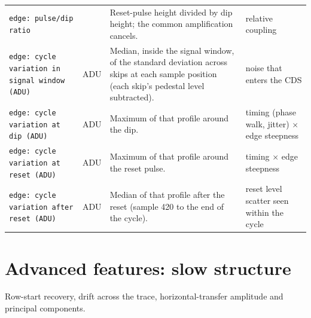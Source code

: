 \documentclass[10pt]{article}
\begin{document}
\begin{longtable}{>{\raggedright\arraybackslash}p{}>{\raggedright\arraybackslash}p{}>{\raggedright\arraybackslash}p{}>{\raggedright\arraybackslash}p{}}
\texttt{edge: pulse/dip ratio} &  & Reset-pulse height divided by dip height; the common amplification cancels. & relative coupling \\
\texttt{edge: cycle variation in signal window (ADU)} & ADU & Median, inside the signal window, of the standard deviation across skips at each sample position (each skip's pedestal level subtracted). & noise that enters the CDS \\
\texttt{edge: cycle variation at dip (ADU)} & ADU & Maximum of that profile around the dip. & timing (phase walk, jitter) $\times$ edge steepness \\
\texttt{edge: cycle variation at reset (ADU)} & ADU & Maximum of that profile around the reset pulse. & timing $\times$ edge steepness \\
\texttt{edge: cycle variation after reset (ADU)} & ADU & Median of that profile after the reset (sample 420 to the end of the cycle). & reset level scatter seen within the cycle \\
\end{longtable}

\section{Advanced features: slow structure}
Row-start recovery, drift across the trace, horizontal-transfer amplitude and principal components.
\end{document}
